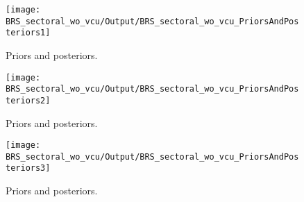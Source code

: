  
\begin{figure}[H]
\centering
\texttt{[image: BRS\_sectoral\_wo\_vcu/Output/BRS\_sectoral\_wo\_vcu\_PriorsAndPosteriors1]}
\caption{Priors and posteriors.}\label{Fig:PriorsAndPosteriors:1}
\end{figure}
 
\begin{figure}[H]
\centering
\texttt{[image: BRS\_sectoral\_wo\_vcu/Output/BRS\_sectoral\_wo\_vcu\_PriorsAndPosteriors2]}
\caption{Priors and posteriors.}\label{Fig:PriorsAndPosteriors:2}
\end{figure}
 
\begin{figure}[H]
\centering
\texttt{[image: BRS\_sectoral\_wo\_vcu/Output/BRS\_sectoral\_wo\_vcu\_PriorsAndPosteriors3]}
\caption{Priors and posteriors.}\label{Fig:PriorsAndPosteriors:3}
\end{figure}
 
